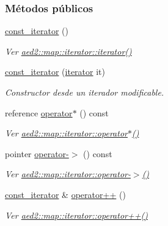 \subsubsection*{Métodos públicos}
\begin{DoxyCompactItemize}
\item 
\hyperlink{classaed2_1_1iterator_1_1const__iterator_aaa51a026552b907959961fb5e890f786_aaa51a026552b907959961fb5e890f786}{const\+\_\+iterator} ()
\begin{DoxyCompactList}\small\item\em Ver \hyperlink{classaed2_1_1map_1_1iterator_acdd790eb54216601a2e0591776004dba_acdd790eb54216601a2e0591776004dba}{aed2\+::map\+::iterator\+::iterator()} \end{DoxyCompactList}\item 
\hyperlink{classaed2_1_1iterator_1_1const__iterator_a721711310bb4fc525e4ce9a2b13f7ce9_a721711310bb4fc525e4ce9a2b13f7ce9}{const\+\_\+iterator} (\hyperlink{classaed2_1_1iterator_1_1iterator}{iterator} it)
\begin{DoxyCompactList}\small\item\em Constructor desde un iterador modificable. \end{DoxyCompactList}\item 
reference \hyperlink{classaed2_1_1iterator_1_1const__iterator_a43ef67b26f144793d7bec567261738a1_a43ef67b26f144793d7bec567261738a1}{operator$\ast$} () const
\begin{DoxyCompactList}\small\item\em Ver \hyperlink{classaed2_1_1map_1_1iterator_ab115711d0295146906830840590d900a_ab115711d0295146906830840590d900a}{aed2\+::map\+::iterator\+::operator$\ast$()} \end{DoxyCompactList}\item 
pointer \hyperlink{classaed2_1_1iterator_1_1const__iterator_afe8d4dc9ecced7c7f42db1b55f008b77_afe8d4dc9ecced7c7f42db1b55f008b77}{operator-\/$>$} () const
\begin{DoxyCompactList}\small\item\em Ver \hyperlink{classaed2_1_1map_1_1iterator_a712522d62f461c1eb9b02ecf248bae8c_a712522d62f461c1eb9b02ecf248bae8c}{aed2\+::map\+::iterator\+::operator-\/$>$()} \end{DoxyCompactList}\item 
\hyperlink{classaed2_1_1iterator_1_1const__iterator}{const\+\_\+iterator} \& \hyperlink{classaed2_1_1iterator_1_1const__iterator_acf3320ad50b0c151117e2384ec784330_acf3320ad50b0c151117e2384ec784330}{operator++} ()
\begin{DoxyCompactList}\small\item\em Ver \hyperlink{classaed2_1_1map_1_1iterator_a7c44de7f0508186e135ddbcfe782fec5_a7c44de7f0508186e135ddbcfe782fec5}{aed2\+::map\+::iterator\+::operator++()} \end{DoxyCompactList}\item 

\end{DoxyCompactItemize}
